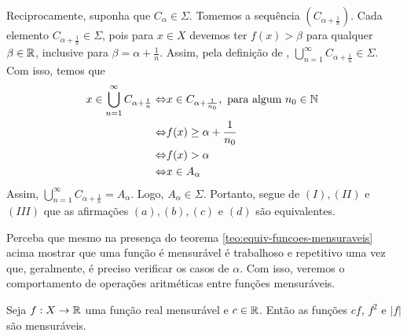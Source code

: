 \begin{prova}
Reciprocamente, suponha que $C_\alpha \in \Sigma$. Tomemos a sequência $\left(C_{\alpha + \frac{1}{n}}\right)$.
Cada elemento $C_{\alpha +\frac{1}{n}} \in \Sigma$, pois para $x \in X$ devemos ter $f(x) > \beta$ para qualquer $\beta \in \mathbb{R}$, inclusive para $\beta = \alpha + \frac{1}{n}$. Assim, pela definição de \sigal, 
$\displaystyle \bigcup_{n = 1}^\infty C_{\alpha +\frac{1}{n}} \in \Sigma$. Com isso, temos que
\begin{align*}
    x \in \displaystyle \bigcup_{n = 1}^\infty C_{\alpha +\frac{1}{n}}
    \Leftrightarrow & x \in C_{\alpha + \frac{1}{n_0}}, \textrm{\ para algum  $n_0 \in \N$ }\\
    \Leftrightarrow & f(x)\geq \alpha +\dfrac{1}{n_0}\\
    \Leftrightarrow & f(x) > \alpha \\
    \Leftrightarrow & x \in A_\alpha
\end{align*}
Assim, $\displaystyle \bigcup_{n = 1}^\infty C_{\alpha +\frac{1}{n}} = A_\alpha$. Logo, $A_\alpha \in \Sigma$.
Portanto, segue de $(I), (II)$ e $(III)$ que as afirmações $(a), (b), (c)$ e $(d)$ são equivalentes.


\end{prova}

Perceba que mesmo na presença do teorema \ref{teo:equiv-funcoes-mensuraveis} acima mostrar que uma função é mensurável é trabalhoso e repetitivo uma vez que, geralmente, é preciso verificar os casos de $\alpha$. Com isso, veremos o comportamento de operações aritméticas entre funções mensuráveis.

\begin{proposition}
\label{prop:aritmetica-uma-funcao}
Seja $f: X \to \mathbb{R}$ uma função real mensurável e $c \in \mathbb{R}$. Então as funções $cf$, $f^2$ e $|f|$ são mensuráveis. 
\end{proposition}

